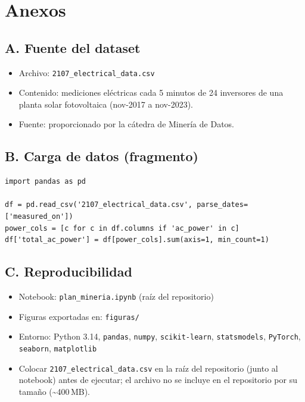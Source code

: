 \section*{Anexos}

\subsection*{A. Fuente del dataset}

\begin{itemize}
    \item Archivo: \texttt{2107\_electrical\_data.csv}
    \item Contenido: mediciones eléctricas cada 5 minutos de 24 inversores de una planta solar fotovoltaica (nov-2017 a nov-2023).
    \item Fuente: proporcionado por la cátedra de Minería de Datos. %
\end{itemize}

\subsection*{B. Carga de datos (fragmento)}

\begin{verbatim}
import pandas as pd

df = pd.read_csv('2107_electrical_data.csv', parse_dates=['measured_on'])
power_cols = [c for c in df.columns if 'ac_power' in c]
df['total_ac_power'] = df[power_cols].sum(axis=1, min_count=1)
\end{verbatim}

\subsection*{C. Reproducibilidad}

\begin{itemize}
    \item Notebook: \texttt{plan\_mineria.ipynb} (raíz del repositorio)
    \item Figuras exportadas en: \texttt{figuras/}
    \item Entorno: Python 3.14, \texttt{pandas}, \texttt{numpy}, \texttt{scikit-learn}, \texttt{statsmodels}, \texttt{PyTorch}, \texttt{seaborn}, \texttt{matplotlib}
    \item Colocar \texttt{2107\_electrical\_data.csv} en la raíz del repositorio (junto al notebook) antes de ejecutar; el archivo no se incluye en el repositorio por su tamaño (\textasciitilde 400\,MB).
\end{itemize}
